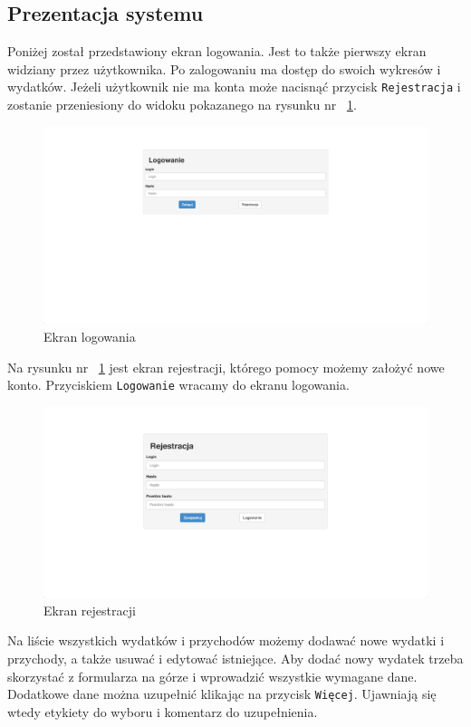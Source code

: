 \documentclass[10pt,titlepage]{article}
\begin{document}
\subsection{Prezentacja systemu}
Poniżej został przedstawiony ekran logowania. Jest to także pierwszy ekran widziany przez użytkownika. Po zalogowaniu ma dostęp do swoich wykresów i wydatków. Jeżeli użytkownik nie ma konta może nacisnąć przycisk \verb|Rejestracja| i zostanie przeniesiony do widoku pokazanego na rysunku nr ~\ref{screen:register}.
\begin{figure}[H]
  \centering
  \includegraphics[scale=0.2]{images/screen_logowanie.png}
  \caption{Ekran logowania}
\end{figure}
Na rysunku nr ~\ref{screen:register} jest ekran rejestracji, którego pomocy możemy założyć nowe konto. Przyciskiem \verb|Logowanie| wracamy do ekranu logowania.
\begin{figure}[H]
  \centering
  \includegraphics[scale=0.2]{images/screen_rejestracja.png}
  \caption{Ekran rejestracji}
  \label{screen:register}
\end{figure}
\par Na liście wszystkich wydatków i przychodów możemy dodawać nowe wydatki i przychody, a także usuwać i edytować istniejące. Aby dodać nowy wydatek trzeba skorzystać z formularza na górze i wprowadzić wszystkie wymagane dane. Dodatkowe dane można uzupełnić klikając na przycisk \verb|Więcej|. Ujawniają się wtedy etykiety do wyboru i komentarz do uzupełnienia.
\end{document}
